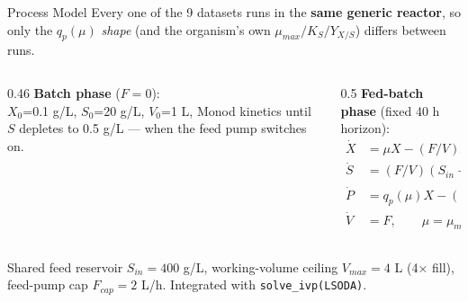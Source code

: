\documentclass[aspectratio=169, 11pt]{beamer}
\begin{document}
\begin{frame}{Process Model}
  Every one of the 9 datasets runs in the \textbf{same generic reactor}, so only the
  $q_p(\mu)$ \textit{shape} (and the organism's own $\mu_{max}/K_S/Y_{X/S}$) differs
  between runs.

  \vspace{0.2cm}
  \begin{columns}[T]
    \begin{column}{0.46\textwidth}
      \textbf{Batch phase} ($F=0$):\\
      {\small $X_0$=0.1 g/L, $S_0$=20 g/L, $V_0$=1 L, Monod kinetics until $S$ depletes
      to 0.5 g/L --- when the feed pump switches on.}
    \end{column}
    \begin{column}{0.5\textwidth}
      \textbf{Fed-batch phase} (fixed 40 h horizon):
      \begin{align*}
        \dot X &= \mu X - (F/V)X \\
        \dot S &= (F/V)(S_{in}-S) - (\mu/Y_{X/S})X \\
        \dot P &= q_p(\mu) X - (F/V)P \\
        \dot V &= F,\qquad \mu = \mu_{max}\tfrac{S}{K_S+S}
      \end{align*}
    \end{column}
  \end{columns}

  \vspace{0.15cm}
  {\small Shared feed reservoir $S_{in}=400$ g/L, working-volume ceiling $V_{max}=4$ L
  (4$\times$ fill), feed-pump cap $F_{cap}=2$ L/h. Integrated with
  \texttt{solve\_ivp(LSODA)}.}
\end{frame}
\end{document}
